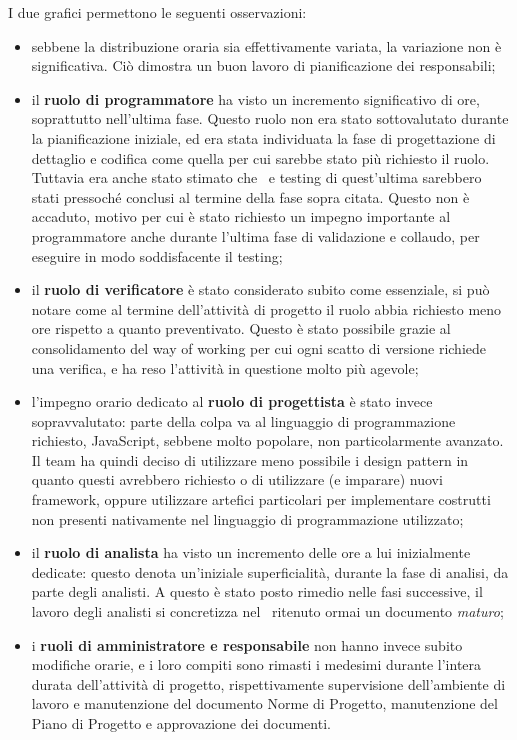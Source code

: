             I due grafici permettono le seguenti osservazioni:
            \begin{itemize}
                \item sebbene la distribuzione oraria sia effettivamente variata, la variazione non è significativa. Ciò dimostra un buon lavoro di pianificazione dei responsabili;
                \item il \textbf{ruolo di programmatore} ha visto un incremento significativo di ore, soprattutto nell'ultima fase. Questo ruolo non era stato sottovalutato durante la pianificazione iniziale, ed era stata individuata la fase di progettazione di dettaglio e codifica come quella per cui sarebbe stato più richiesto il ruolo. Tuttavia era anche stato stimato che \hd\ e testing di quest'ultima sarebbero stati pressoché conclusi al termine della fase sopra citata. Questo non è accaduto, motivo per cui è stato richiesto un impegno importante al programmatore anche durante l'ultima fase di validazione e collaudo, per eseguire in modo soddisfacente il testing;
                \item il \textbf{ruolo di verificatore} è stato considerato subito come essenziale, si può notare come al termine dell'attività di progetto il ruolo abbia richiesto meno ore rispetto a quanto preventivato. Questo è stato possibile grazie al consolidamento del way of working per cui ogni scatto di versione richiede una verifica, e ha reso l'attività in questione molto più agevole;
                \item l'impegno orario dedicato al \textbf{ruolo di progettista} è stato invece sopravvalutato: parte della colpa va al linguaggio di programmazione richiesto, JavaScript, sebbene molto popolare, non particolarmente avanzato. Il team ha quindi deciso di utilizzare meno possibile i design pattern in quanto questi avrebbero richiesto o di utilizzare (e imparare) nuovi framework, oppure utilizzare artefici particolari per implementare costrutti non presenti nativamente nel linguaggio di programmazione utilizzato;
                \item il \textbf{ruolo di analista} ha visto un incremento delle ore a lui inizialmente dedicate: questo denota un'iniziale superficialità, durante la fase di analisi, da parte degli analisti. A questo è stato posto rimedio nelle fasi successive, il lavoro degli analisti si concretizza nel \AdR\ ritenuto ormai un documento \textit{maturo};
                \item i \textbf{ruoli di amministratore e responsabile} non hanno invece subito modifiche orarie, e i loro compiti sono rimasti i medesimi durante l'intera durata dell'attività di progetto, rispettivamente supervisione dell'ambiente di lavoro e manutenzione del documento Norme di Progetto, manutenzione del Piano di Progetto e approvazione dei documenti.
            \end{itemize}
        \noindent

